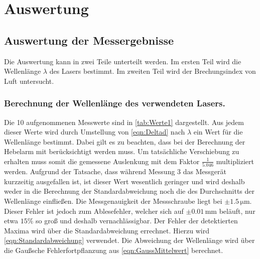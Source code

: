 \section{Auswertung}
\label{sec:Auswertung}


\subsection{Auswertung der Messergebnisse}

Die Auswertung kann in zwei Teile unterteilt werden. Im ersten Teil wird die Wellenlänge $\lambda$ des Lasers bestimmt. Im zweiten Teil wird
der Brechungsindex von Luft untersucht.

\subsubsection{Berechnung der Wellenlänge des verwendeten Lasers.}
\label{sec:Wellenlänge}
Die 10 aufgenommenen Messwerte sind in \autoref{tab:Werte1} dargestellt. Aus jedem dieser Werte wird durch Umstellung von \autoref{eqn:Deltad} nach $\lambda$ ein Wert für die Wellenlänge bestimmt. 
Dabei gilt es zu beachten, dass bei der Berechnung der Hebelarm mit berücksichtigt werden muss. Um tatsächliche Verschiebung zu erhalten muss somit die gemessene Auslenkung mit dem Faktor $\frac{1}{5.046}$ multipliziert werden.%
Aufgrund der Tatsache, dass während Messung 3 das Messgerät kurzzeitig ausgefallen ist, ist dieser Wert wesentlich geringer und wird deshalb weder in die Berechnung der Standardabweichung noch die des Durchschnitts der Wellenlänge einfließen.
Die Messgenauigkeit der Messschraube liegt bei $\pm 1.5\, \unit{\micro \meter}$\cite{Messgenauigkeit}. Dieser Fehler ist jedoch zum Ablesefehler, welcher sich auf $\pm 0.01\, \unit{\milli \meter}$ beläuft, nur etwa $15 \%$ so groß und deshalb vernachlässigbar.
Der Fehler der detektierten Maxima wird über die Standardabweichung errechnet. Hierzu wird \autoref{eqn:Standardabweichung} verwendet. Die Abweichung der Wellenlänge wird über die Gaußsche Fehlerfortpflanzung aus \autoref{eqn:GaussMittelwert} berechnet. 
